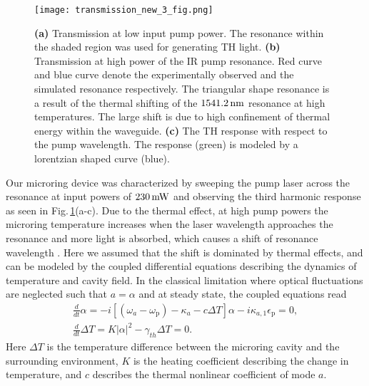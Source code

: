 \documentclass[9pt,twocolumn,twoside]{optica}
\begin{document}
%
\begin{figure}[ht]
\centering
\texttt{[image: transmission\_new\_3\_fig.png]}
\caption{\textbf{(a)} Transmission at low input pump power.  The resonance within the shaded region was used for generating TH light. \textbf{(b)} Transmission at high power of the IR pump resonance. Red curve and blue curve denote the experimentally observed and the simulated resonance respectively. The triangular shape resonance is a result of the thermal shifting of the $1541.2\thinspace\mathrm{nm}$ resonance at high temperatures. The large shift is due to high confinement of thermal energy within the waveguide. \textbf{(c)} The TH response with respect to the pump wavelength. The response (green) is modeled by a lorentzian shaped curve (blue).}
\label{fig:transmission}
\end{figure}
%
Our microring device was characterized by sweeping the pump laser across the resonance at input powers of $230\thinspace\mathrm{mW}$ and observing the third harmonic response as seen in Fig.$\,$\ref{fig:transmission}(a-c). Due to the thermal effect, at high pump powers the microring temperature increases when the laser wavelength approaches the resonance and more light is absorbed, which causes a shift of resonance wavelength \cite{Carmon:04}. Here we assumed that the shift is dominated by thermal effects, and can be modeled by the coupled differential equations describing the dynamics of temperature and cavity field. In the classical limitation where optical fluctuations are neglected such that $a=\alpha$ and at steady state, the coupled equations read
%
\begin{eqnarray}
\frac{d}{dt}\alpha=-i[(\omega_{a}-\omega_{\mathrm{p}})-\kappa_{a}-c\Delta T]\alpha-i\kappa_{a,1}\epsilon_{\mathrm{p}}=0,\\
\frac{d}{dt}\Delta T=K|\alpha|^{2}-\gamma_{th}\Delta T=0.
\end{eqnarray}
%
Here $\Delta T$ is the temperature difference between the microring cavity and the surrounding environment, $K$ is the heating coefficient describing the change in temperature, and $c$ describes the thermal nonlinear coefficient of mode $a$.
\end{document}
